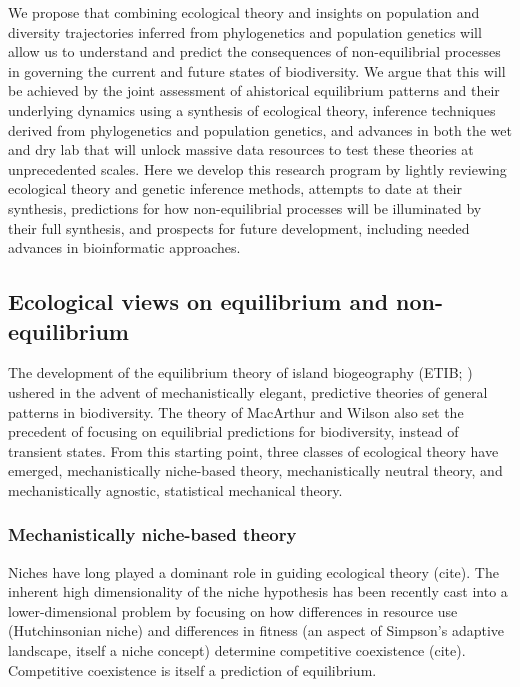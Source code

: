 \documentclass[12pt]{article}
\begin{document}
We propose that combining ecological theory and insights on population
and diversity trajectories inferred from phylogenetics and population
genetics will allow us to understand and predict the consequences of
non-equilibrial processes in governing the current and future states
of biodiversity. We argue that this will be achieved by the joint
assessment of ahistorical equilibrium patterns and their underlying
dynamics using a synthesis of ecological theory, inference techniques
derived from phylogenetics and population genetics, and advances in
both the wet and dry lab that will unlock massive data resources to
test these theories at unprecedented scales. Here we develop this
research program by lightly reviewing ecological theory and genetic
inference methods, attempts to date at their synthesis, predictions
for how non-equilibrial processes will be illuminated by their full
synthesis, and prospects for future development, including needed
advances in bioinformatic approaches.

\subsection{Ecological views on equilibrium and non-equilibrium}

The development of the equilibrium theory of island biogeography
(ETIB; \cite{MacArthur1967-ux}) ushered in the advent of
mechanistically elegant, predictive theories of general patterns in
biodiversity. The theory of MacArthur and Wilson also set the
precedent of focusing on equilibrial predictions for biodiversity,
instead of transient states. From this starting point, three classes
of ecological theory have emerged, mechanistically niche-based theory,
mechanistically neutral theory, and mechanistically agnostic,
statistical mechanical theory.

\subsubsection{Mechanistically niche-based theory}

Niches have long played a dominant role in guiding ecological theory
(cite). The inherent high dimensionality of the niche hypothesis has
been recently cast into a lower-dimensional problem by focusing on how
differences in resource use (Hutchinsonian niche) and differences in
fitness (an aspect of Simpson's adaptive landscape, itself a niche
concept) determine competitive coexistence (cite). Competitive
coexistence is itself a prediction of equilibrium.
\end{document}
